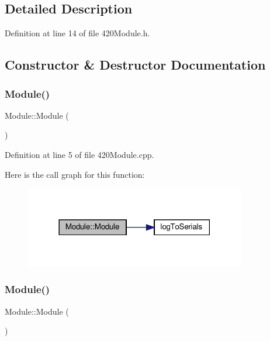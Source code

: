 \subsection{Detailed Description}


Definition at line 14 of file 420\+Module.\+h.



\subsection{Constructor \& Destructor Documentation}
\mbox{\label{class_module_a5a240a8a9ab1813b17bcb810b24ceaea}} 
\subsubsection{\texorpdfstring{Module()}{Module()}\hspace{0.1cm}{\footnotesize\ttfamily [1/2]}}
{\footnotesize\ttfamily Module\+::\+Module (\begin{DoxyParamCaption}{ }\end{DoxyParamCaption})}



Definition at line 5 of file 420\+Module.\+cpp.

Here is the call graph for this function\+:
\nopagebreak
\begin{figure}[H]
\begin{center}
\leavevmode
\includegraphics[width=273pt]{class_module_a5a240a8a9ab1813b17bcb810b24ceaea_cgraph}
\end{center}
\end{figure}
\mbox{\label{class_module_a5a240a8a9ab1813b17bcb810b24ceaea}} 
\subsubsection{\texorpdfstring{Module()}{Module()}\hspace{0.1cm}{\footnotesize\ttfamily [2/2]}}
{\footnotesize\ttfamily Module\+::\+Module (\begin{DoxyParamCaption}{ }\end{DoxyParamCaption})}



